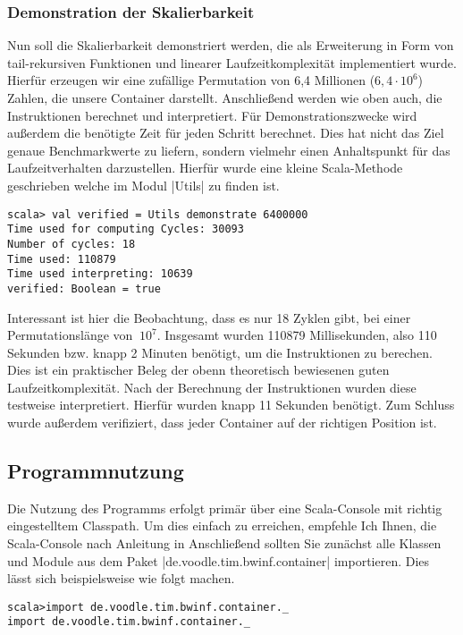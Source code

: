 \subsubsection{Demonstration der Skalierbarkeit}
\label{scalability}
Nun soll die Skalierbarkeit demonstriert werden,
die als Erweiterung in Form von tail-rekursiven Funktionen und linearer Laufzeitkomplexität implementiert wurde.\\
Hierfür erzeugen wir eine zufällige Permutation von 6,4 Millionen ($6,4 \cdot 10^6$) Zahlen, die unsere Container darstellt.
Anschließend werden wie oben auch, die Instruktionen berechnet und interpretiert.
Für Demonstrationszwecke wird außerdem die benötigte Zeit für jeden Schritt berechnet.
Dies hat nicht das Ziel genaue Benchmarkwerte zu liefern, sondern vielmehr einen Anhaltspunkt für das Laufzeitverhalten darzustellen.
Hierfür wurde eine kleine Scala-Methode geschrieben welche im Modul |Utils| zu finden ist.
\begin{lstlisting}
scala> val verified = Utils demonstrate 6400000
Time used for computing Cycles: 30093
Number of cycles: 18
Time used: 110879
Time used interpreting: 10639
verified: Boolean = true
\end{lstlisting}
Interessant ist hier die Beobachtung, dass es nur 18 Zyklen gibt, bei einer Permutationslänge von $~10^7$.
Insgesamt wurden 110879 Millisekunden, also 110 Sekunden bzw. knapp 2 Minuten benötigt, um die Instruktionen zu berechen.
Dies ist ein praktischer Beleg der obenn theoretisch bewiesenen guten Laufzeitkomplexität.
Nach der Berechnung der Instruktionen wurden diese testweise interpretiert. Hierfür wurden knapp 11 Sekunden benötigt.
Zum Schluss wurde außerdem verifiziert, dass jeder Container auf der richtigen Position ist.

\subsection{Programmnutzung}
\lstset{basicstyle=\ttfamily\small}
Die Nutzung des Programms erfolgt primär über eine Scala-Console mit richtig eingestelltem Classpath.
Um dies einfach zu erreichen, empfehle Ich Ihnen, die Scala-Console nach Anleitung in 
Anschließend sollten Sie zunächst alle Klassen und Module aus dem Paket |de.voodle.tim.bwinf.container| importieren. Dies lässt sich beispielsweise wie folgt machen.
\begin{lstlisting}
scala>import de.voodle.tim.bwinf.container._
import de.voodle.tim.bwinf.container._
\end{lstlisting}
